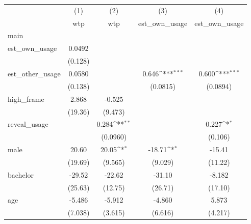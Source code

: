 {
\def\sym#1{\ifmmode^{#1}\else\(^{#1}\)\fi}
\begin{tabular}{l*{4}{c}}
\toprule
            &\multicolumn{1}{c}{(1)}&\multicolumn{1}{c}{(2)}&\multicolumn{1}{c}{(3)}&\multicolumn{1}{c}{(4)}\\
            &\multicolumn{1}{c}{wtp}&\multicolumn{1}{c}{wtp}&\multicolumn{1}{c}{est\_own\_usage}&\multicolumn{1}{c}{est\_own\_usage}\\
\midrule
main        &                     &                     &                     &                     \\
est\_own\_usage&      0.0492         &                     &                     &                     \\
            &     (0.128)         &                     &                     &                     \\
\addlinespace
est\_other\_usage&      0.0580         &                     &       0.646\sym{***}&       0.600\sym{***}\\
            &     (0.138)         &                     &    (0.0815)         &    (0.0894)         \\
\addlinespace
high\_frame  &       2.868         &      -0.525         &                     &                     \\
            &     (19.36)         &     (9.473)         &                     &                     \\
\addlinespace
reveal\_usage&                     &       0.284\sym{**} &                     &       0.227\sym{*}  \\
            &                     &    (0.0960)         &                     &     (0.106)         \\
\addlinespace
male        &       20.60         &       20.05\sym{*}  &      -18.71\sym{*}  &      -15.41         \\
            &     (19.69)         &     (9.565)         &     (9.029)         &     (11.22)         \\
\addlinespace
bachelor    &      -29.52         &      -22.62         &      -31.10         &      -8.182         \\
            &     (25.63)         &     (12.75)         &     (26.71)         &     (17.10)         \\
\addlinespace
age         &      -5.486         &      -5.912         &      -4.860         &       5.873         \\
            &     (7.038)         &     (3.615)         &     (6.616)         &     (4.217)         \\

\end{tabular}}
